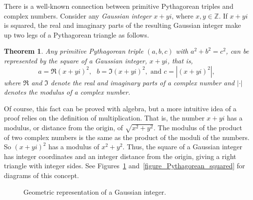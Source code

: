\documentclass[12pt,table]{article}
\newtheorem{theorem}{Theorem}[section]
\theoremstyle{definition}
\theoremstyle{remark}
\newcommand{\Zzz}{\mathbb Z}
\numberwithin{equation}{section}
\begin{document}
There is a well-known connection between primitive Pythagorean triples
and complex numbers. Consider any {\em Gaussian integer} $x+yi$,
where $x, y \in \Zzz$.
If $x + yi$  is squared, the real and imaginary
parts of the resulting Gaussian integer make up two legs of
a Pythagorean triangle as follows. 


\begin{theorem}
Any primitive Pythagorean triple $(a,b,c)$ with
$a^2 + b^2 = c^2$, can be represented
by the square of a Gaussian integer, $x+yi$,
that is,
\[
    a =  \Re{(x+yi)^2},  \:\:\: b = \Im{(x+yi)^2},
    \mbox{   and   }
    c = |(x+yi)^2|,
\]
where $\Re$ and $\Im$ denote the real and imaginary parts of a complex number
and
$| \cdot |$ denotes the modulus of a complex number.
\end{theorem}



Of course, this fact can be proved with
algebra, but a more intuitive 
idea of a proof relies on the definition 
of multiplication. That is, the number $x+yi$ has a modulus, or     
distance from the origin, of $\sqrt{x^2+y^2}$. The modulus of the       
product of two complex numbers is the same as the product of
the moduli of the numbers.
So $(x+yi)^2$ has a modulus of $x^2+y^2$. Thus, the square of a 
Gaussian integer has integer coordinates and an integer distance
from the origin, giving a right triangle with integer sides.
See Figures~\ref{figure_Pythagorean} 
and~\ref{figure_Pythagorean_squared} for diagrams of this 
concept.

\begin{figure}
\begin{center}
\end{center}
\caption{Geometric representation of a Gaussian integer.}
\label{figure_Pythagorean}
\end{figure}
\end{document}
